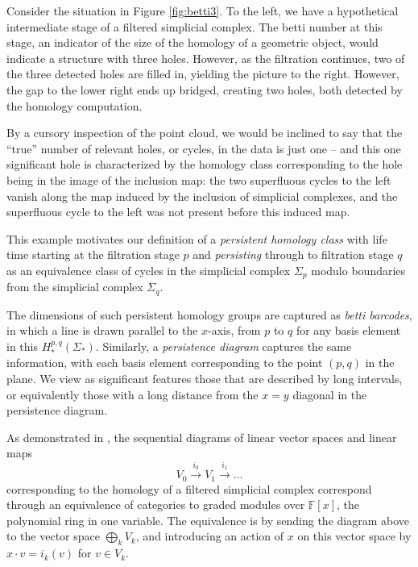 \documentclass{gts2012}
\begin{document}
Consider the situation in Figure \ref{fig:betti3}. To the left, we
have a hypothetical intermediate stage of a filtered simplicial
complex. The betti number at this stage, an indicator of the size of
the homology of a geometric object, would indicate a structure with
three holes. However, as the filtration continues, two of the three
detected holes are filled in, yielding the picture to the
right. However, the gap to the lower right ends up bridged, creating
two holes, both detected by the homology computation.

By a cursory inspection of the point cloud, we would be inclined to
say that the ``true'' number of relevant holes, or cycles, in the data
is just one -- and this one significant hole is characterized by the
homology class corresponding to the hole being in the image of the
inclusion map: the two superfluous cycles to the left vanish along the
map induced by the inclusion of simplicial complexes, and the
superfluous cycle to the left was not present before this induced
map.

This example motivates our definition of a \emph{persistent homology class}
with life time starting at the filtration stage $p$ and
\emph{persisting} through to filtration stage $q$ as an equivalence
class of cycles in the simplicial complex $\Sigma_p$ modulo boundaries
from the simplicial complex $\Sigma_q$.


The dimensions of such persistent homology groups are captured as
\emph{betti barcodes}, in which a line is drawn parallel to the
$x$-axis, from $p$ to $q$ for any basis element in this
$H^{p,q}_*(\Sigma_*)$. Similarly, a \emph{persistence diagram}
captures the same information, with each basis element corresponding
to the point $(p,q)$ in the plane. We view as significant features
those that are described by long intervals, or equivalently those with
a long distance from the $x=y$ diagonal in the persistence diagram.

As demonstrated in \cite{Carlsson_04}, the sequential diagrams of
linear vector spaces and linear maps
\[
V_0 \xrightarrow{i_0} V_1 \xrightarrow{i_1} \dots 
\]
corresponding to the homology of a filtered simplicial complex
correspond through an equivalence of categories to graded modules over
$\mathbb{F}[x]$, the polynomial ring in one variable. The equivalence
is by sending the diagram above to the vector space $\bigoplus_k V_k$,
and introducing an action of $x$ on this vector space by $x\cdot v=i_k(v)$
for $v\in V_k$.
\end{document}
